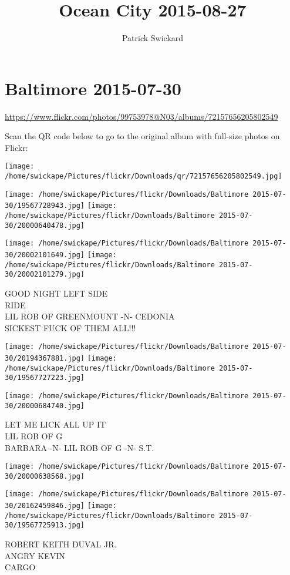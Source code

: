 \documentclass[10pt,letterpaper]{article}
\title{Ocean City 2015-08-27}
\author{Patrick Swickard}
\date{}
\begin{document}
\section*{Baltimore 2015-07-30}

\url{https://www.flickr.com/photos/99753978@N03/albums/72157656205802549}

Scan the QR code below to go to the original album with full-size photos on Flickr:

\texttt{[image: /home/swickape/Pictures/flickr/Downloads/qr/72157656205802549.jpg]}
\pagebreak

\texttt{[image: /home/swickape/Pictures/flickr/Downloads/Baltimore 2015-07-30/19567728943.jpg]}
\texttt{[image: /home/swickape/Pictures/flickr/Downloads/Baltimore 2015-07-30/20000640478.jpg]}

\texttt{[image: /home/swickape/Pictures/flickr/Downloads/Baltimore 2015-07-30/20002101649.jpg]}
\texttt{[image: /home/swickape/Pictures/flickr/Downloads/Baltimore 2015-07-30/20002101279.jpg]}

GOOD NIGHT LEFT SIDE\\
RIDE\\
LIL ROB OF GREENMOUNT {-}N{-} CEDONIA\\
SICKEST FUCK OF THEM ALL!!!
\pagebreak

\texttt{[image: /home/swickape/Pictures/flickr/Downloads/Baltimore 2015-07-30/20194367881.jpg]}
\texttt{[image: /home/swickape/Pictures/flickr/Downloads/Baltimore 2015-07-30/19567727223.jpg]}

\texttt{[image: /home/swickape/Pictures/flickr/Downloads/Baltimore 2015-07-30/20000684740.jpg]}

LET ME LICK ALL UP IT\\
LIL ROB OF G\\
BARBARA {-}N{-} LIL ROB OF G {-}N{-} S.T.
\pagebreak

\texttt{[image: /home/swickape/Pictures/flickr/Downloads/Baltimore 2015-07-30/20000638568.jpg]}

\vspace{0.25in}
\texttt{[image: /home/swickape/Pictures/flickr/Downloads/Baltimore 2015-07-30/20162459846.jpg]}
\texttt{[image: /home/swickape/Pictures/flickr/Downloads/Baltimore 2015-07-30/19567725913.jpg]}

ROBERT KEITH DUVAL JR.\\
ANGRY KEVIN\\
CARGO
\pagebreak
\end{document}
